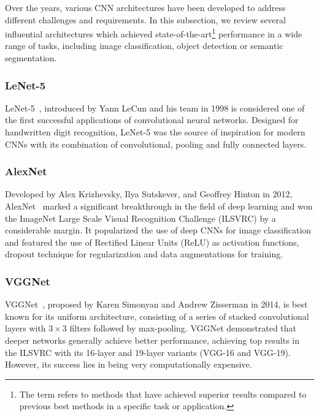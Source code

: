 
Over the years, various CNN architectures have been developed to address
different challenges and requirements. In this subsection, we review several
influential architectures which achieved state-of-the-art\footnote{The term
 refers to methods that have achieved superior results
compared to previous best methods in a specific task or application.}
performance in a wide range of tasks, including image classification, object
detection or semantic segmentation.


\subsubsection{LeNet-5}

LeNet-5~\cite{Lecun1998}, introduced by Yann LeCun and his team in 1998 is
considered one of the first successful applications of convolutional neural
networks. Designed for handwritten digit recognition, LeNet-5 was the source of
inspiration for modern CNNs with its combination of convolutional, pooling and
fully connected layers.


\subsubsection{AlexNet}

Developed by Alex Krizhevsky, Ilya Sutskever, and Geoffrey Hinton in 2012,
AlexNet~\cite{NIPS2012} marked a significant breakthrough in the field of deep
learning and won the ImageNet Large Scale Visual Recognition Challenge (ILSVRC)
by a considerable margin. It popularized the use of deep CNNs for image
classification and featured the use of Rectified Linear Units (ReLU) as
activation functions, dropout technique for regularization and data
augmentations for training.


\subsubsection{VGGNet}

VGGNet~\cite{Simonyan2014}, proposed by Karen Simonyan and Andrew Zisserman in
2014, is best known for its uniform architecture, consisting of a series of
stacked convolutional layers with $3 \times 3$ filters followed by max-pooling.
VGGNet demonstrated that deeper networks generally achieve better performance,
achieving top results in the ILSVRC with its 16-layer and 19-layer variants
(VGG-16 and VGG-19). However, its success lies in being very computationally
expensive.


